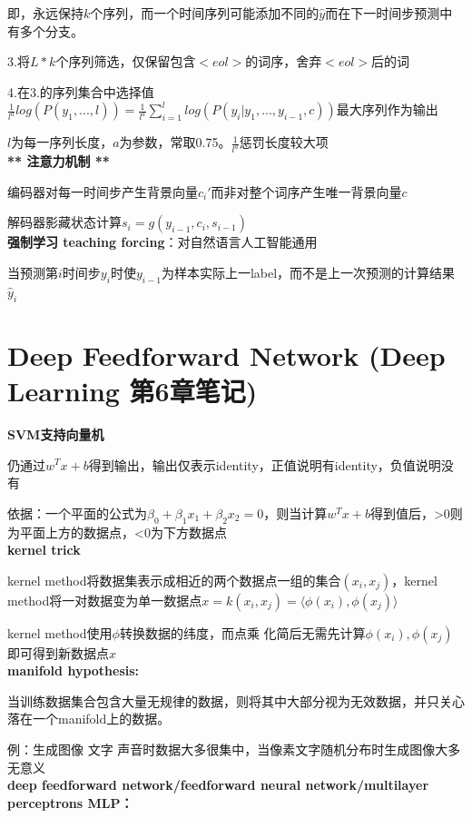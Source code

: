 \documentclass[UTF8]{ctexart}
\begin{document}
  \quad \quad \quad 即，永远保持$k$个序列，而一个时间序列可能添加不同的$\hat{y}$而在下一时间步预测中有多个分支。
  
  \quad \quad 3.将$L*k$个序列筛选，仅保留包含$<eol>$的词序，舍弃$<eol>$后的词
  
  \quad \quad 4.在3.的序列集合中选择值$\frac{1}{l^a}log(P(y_1, ...,l))=\frac{1}{l^a}\sum_{i=1}^llog(P(y_i|y_1, ..., y_{i-1}, c))$最大序列作为输出
  
  \quad \quad \quad $l$为每一序列长度，$a$为参数，常取0.75。$\frac{1}{l^a}$惩罚长度较大项\\
\textbf{** 注意力机制 **}

  编码器对每一时间步产生背景向量$c_i'$而非对整个词序产生唯一背景向量$c$

  解码器影藏状态计算$s_i = g(y_{i-1}, c_i, s_{i-1})$\\
\textbf{强制学习 teaching forcing}：对自然语言人工智能通用

  当预测第$i$时间步$y_i$时使$y_{i-1}$为样本实际上一label，而不是上一次预测的计算结果$\hat{y}_i$



\section{Deep Feedforward Network (Deep Learning 第6章笔记)}
\noindent \textbf{SVM支持向量机}

  仍通过$w^Tx+b$得到输出，输出仅表示identity，正值说明有identity，负值说明没有

  依据：一个平面的公式为$\beta_0+\beta_1x_1+\beta_2x_2=0$，则当计算$w^Tx+b$得到值后，>0则为平面上方的数据点，<0为下方数据点\\
\textbf{kernel trick}

  kernel method将数据集表示成相近的两个数据点一组的集合$(x_i, x_j)$，kernel method将一对数据变为单一数据点$x=k(x_i, x_j)=\langle \phi (x_i), \phi (x_j)\rangle $

  kernel method使用$\phi $转换数据的纬度，而点乘 化简后无需先计算$\phi (x_i), \phi (x_j)$即可得到新数据点$x$\\
\textbf{manifold hypothesis:}

  当训练数据集合包含大量无规律的数据，则将其中大部分视为无效数据，并只关心落在一个manifold上的数据。

  例：生成图像 文字 声音时数据大多很集中，当像素文字随机分布时生成图像大多无意义\\
\textbf{deep feedforward network/feedforward neural network/multilayer perceptrons MLP：}
\end{document}
